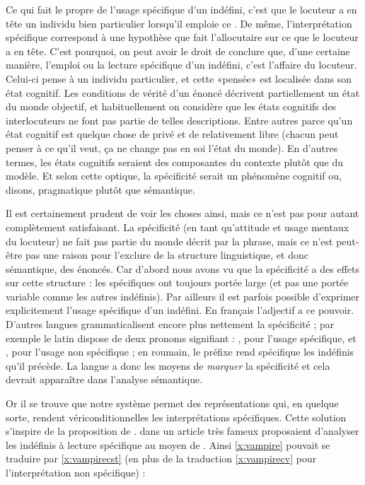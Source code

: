 Ce qui fait le propre de l'usage spécifique d'un {\GN} indéfini, c'est
que le locuteur a en tête un individu bien particulier lorsqu'il
emploie ce {\GN}.  De même, l'interprétation spécifique correspond à
une hypothèse que fait l'allocutaire sur ce que le locuteur a en tête.
C'est pourquoi, on peut avoir le droit de conclure que, d'une certaine
manière, l'emploi ou la lecture spécifique d'un indéfini, c'est
l'affaire du locuteur. Celui-ci pense à un individu particulier, et
cette «pensée» est localisée dans son état cognitif.  Les
conditions de vérité d'un énoncé décrivent partiellement un état du
monde objectif, et habituellement on considère que les états cognitifs
des interlocuteurs ne font pas partie de telles descriptions.  Entre
autres parce qu'un état cognitif est quelque chose de privé et de
relativement libre (chacun peut penser à ce qu'il veut, ça ne change
pas en soi l'état du monde).  En d'autres termes, les états cognitifs
seraient des composantes du contexte plutôt que du modèle.  Et selon
cette optique, la spécificité serait un phénomène cognitif ou, disons,
pragmatique plutôt que sémantique.


Il est certainement prudent de voir les choses ainsi, mais ce n'est
pas pour autant complètement satisfaisant.  La spécificité (en tant
qu'attitude et usage mentaux du locuteur) ne fait pas partie du monde
décrit par la phrase, %
mais ce n'est peut-être pas une raison pour
l'exclure de la structure linguistique, et donc sémantique, des
énoncés.  Car d'abord nous avons vu que la spécificité a des effets
sur cette structure :  les
{\GN} spécifiques ont toujours portée large (et pas une portée
variable comme les autres {\GN} indéfinis).  Par ailleurs il est
parfois possible d'exprimer explicitement l'usage spécifique d'un
indéfini.  En français l'adjectif  a ce pouvoir.
D'autres langues grammaticalisent encore plus nettement la
spécificité ; par exemple le latin dispose de deux pronoms signifiant
 : , pour l'usage spécifique, et
, pour l'usage non spécifique ; en roumain, le préfixe
 rend spécifique les {\GN} indéfinis qu'il précède.  La
langue a donc les moyens de \emph{marquer} la spécificité et cela devrait
 apparaître dans l'analyse sémantique.


\sloppy

Or il se trouve que notre système {\LO} permet des représentations
qui, en quelque sorte, rendent vériconditionnelles les interprétations
spécifiques.  Cette solution s'inspire de la proposition de
\citet{FodorSag:82}.  
\citeauthor{FodorSag:82} dans un article très fameux proposaient
d'analyser les indéfinis à lecture spécifique au moyen de .
Ainsi \ref{x:vampire} pouvait se traduire par \ref{x:vampirecst} (en
plus de la traduction \ref{x:vampirecv} pour l'interprétation non
spécifique) : 

